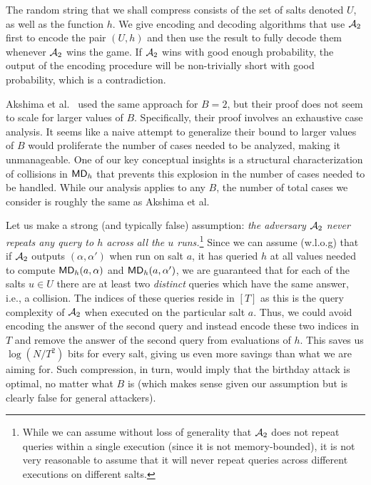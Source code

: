 
The random string that we shall compress consists of the set of salts denoted $U$, as well as the function $h$.
We give encoding and decoding algorithms that use $\mathcal{A}_2$ first to encode the pair $(U,h) $ and then use the result to fully decode them whenever $\mathcal{A}_2$ wins the game. If $\mathcal{A}_2$ wins with good enough probability, the output of the encoding procedure will be non-trivially short with good probability, which is a contradiction. 


\begin{remark}
 Akshima et al.~\cite{AkshimaCDW20} used the same approach for $B=2$, but their proof does not seem to scale for larger values of $B$. Specifically, their proof involves an exhaustive case analysis. It seems like a naive attempt to generalize their bound to larger values of $B$ would proliferate the number of cases needed to be analyzed, making it unmanageable.  One of our key conceptual insights is a structural characterization of collisions in $\mathsf{MD}_h$ that prevents this explosion in the number of cases needed to be handled. While our analysis applies to any $B$, the number of total cases we consider is roughly the same as Akshima et al.
\end{remark}


Let us make a strong (and typically false) assumption: \emph{the adversary $\mathcal{A}_2$ never repeats any query to $h$ across all the $u$ runs.}\footnote{While we can assume without loss of generality that $\mathcal{A}_2$ does not repeat queries within a single execution (since it is not memory-bounded), it is not very reasonable to assume that it will never repeat queries across different executions on different salts.} Since we can assume (w.l.o.g) that if $\mathcal{A}_2$ outputs $(\alpha,\alpha')$ when run on salt $a$, it has queried $h$ at all values needed to compute $\mathsf{MD}_h(a,\alpha)$ and $\mathsf{MD}_h(a,\alpha')$, we are guaranteed that for  each of the salts $u\in U$  there are at least two \emph{distinct} queries which have the same answer, i.e., a collision. The indices of these queries reside in $[T]$ as this is the query complexity of $\mathcal{A}_2$ when executed on the particular salt $a$. Thus, we could avoid encoding the answer of the second query and instead encode these two indices in $T$ and remove the answer of the second query from evaluations of $h$. This saves us $\log (N/T^2)$ bits for every salt, giving us even more savings than what we are aiming for. Such compression, in turn, would imply that the birthday attack is optimal, no matter what $B$ is (which makes sense given our assumption but is clearly false for general attackers). 


